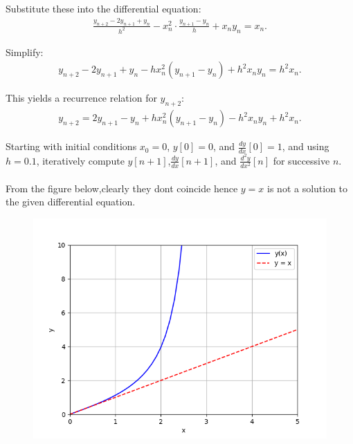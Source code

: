 \documentclass[journal]{IEEEtran}
\begin{document}
Substitute these into the differential equation:
\begin{align}
    \frac{y_{n+2} - 2y_{n+1} + y_n}{h^2} - x_n^2 \cdot \frac{y_{n+1} - y_n}{h} + x_n y_n = x_n.
\end{align}

Simplify:
\begin{align}
    y_{n+2} - 2y_{n+1} + y_n - h x_n^2 (y_{n+1} - y_n) + h^2 x_n y_n = h^2 x_n.
\end{align}

This yields a recurrence relation for $y_{n+2}$:
\begin{align}
    y_{n+2} = 2y_{n+1} - y_n + h x_n^2 (y_{n+1} - y_n) - h^2 x_n y_n + h^2 x_n.
\end{align}


Starting with initial conditions $x_0 = 0$, $y[0] = 0$, and $\frac{dy}{dx}[0] = 1$, and using $h = 0.1$, iteratively compute $y[n+1]$,$\frac{dy}{dx}[n+1]$, and $\frac{d^2y}{dx^2}[n]$ for successive $n$.\\
\\
From the figure below,clearly they dont coincide hence $y=x$ is not a solution to the given differential equation.


\begin{figure}[ht]
	\centering
	\includegraphics[width=1\textwidth]{figs/fig.png}
	\label{fig:Plot1}
\end{figure}
\end{document}
